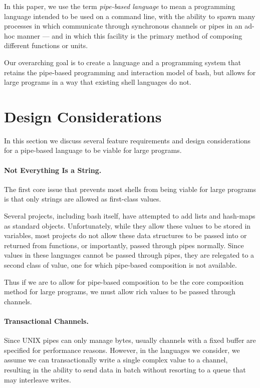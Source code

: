 \documentclass[english,preprint,JIP]{ipsj}
\begin{document}
In this paper, we use the term \emph{pipe-based language} to mean a programming language intended to be used on a command line, with the ability to spawn many processes in which communicate through synchronous channels or pipes in an ad-hoc manner --- and in which this facility is the primary method of composing different functions or units.

Our overarching goal is to create a language and a programming system that retains the pipe-based programming and interaction model of bash, but allows for large programs in a way that existing shell languages do not.

\section{Design Considerations}
In this section we discuss several feature requirements and design considerations for a pipe-based language to be viable for large programs.

\paragraph{Not Everything Is a String.}
The first core issue that prevents most shells from being viable for large programs is that only strings are allowed as first-class values.

Several projects\cite{haahr}\cite{duff}, including bash itself, have attempted to add lists and hash-maps as standard objects. Unfortunately, while they allow these values to be stored in variables, most projects do not allow these data structures to be passed into or returned from functions, or importantly, passed through pipes normally.
Since values in these languages cannot be passed through pipes, they are relegated to a second class of value, one for which pipe-based composition is not available.

Thus if we are to allow for pipe-based composition to be the core composition method for large programs, we must allow rich values to be passed through channels.

\paragraph{Transactional Channels.}
Since UNIX pipes can only manage bytes, usually channels with a fixed buffer are specified for performance reasons. However, in the languages we consider, we assume we can transactionally write a single complex value to a channel, resulting in the ability to send data in batch without resorting to a queue that may interleave writes.
\end{document}
